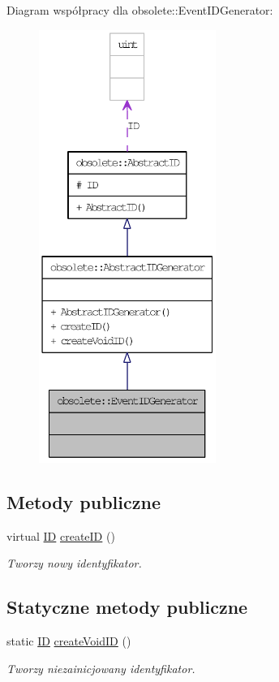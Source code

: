 Diagram współpracy dla obsolete::EventIDGenerator:\nopagebreak
\begin{figure}[H]
\begin{center}
\leavevmode
\includegraphics[height=400pt]{classobsolete_1_1EventIDGenerator__coll__graph}
\end{center}
\end{figure}
\subsection*{Metody publiczne}
\begin{DoxyCompactItemize}
\item 
virtual \hyperlink{classobsolete_1_1ID}{ID} \hyperlink{classobsolete_1_1AbstractIDGenerator_a39d2f0147e3a028fef8299770e23db90}{createID} ()
\begin{DoxyCompactList}\small\item\em Tworzy nowy identyfikator. \item\end{DoxyCompactList}\end{DoxyCompactItemize}
\subsection*{Statyczne metody publiczne}
\begin{DoxyCompactItemize}
\item 
static \hyperlink{classobsolete_1_1ID}{ID} \hyperlink{classobsolete_1_1AbstractIDGenerator_a330da88ba80820ca6ce0a29cbbab9e1b}{createVoidID} ()
\begin{DoxyCompactList}\small\item\em Tworzy niezainicjowany identyfikator. \item\end{DoxyCompactList}\end{DoxyCompactItemize}
